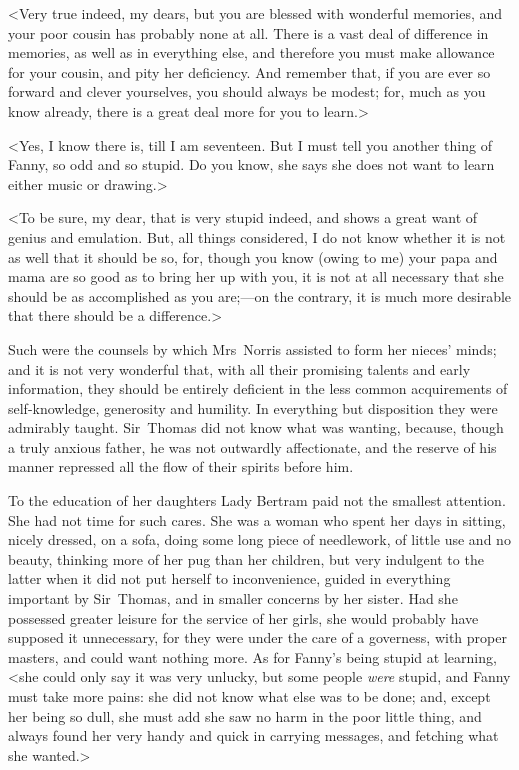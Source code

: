 <Very true indeed, my dears, but you are blessed with wonderful memories, and your poor cousin has probably none at all. There is a vast deal of difference in memories, as well as in everything else, and therefore you must make allowance for your cousin, and pity her deficiency. And remember that, if you are ever so forward and clever yourselves, you should always be modest; for, much as you know already, there is a great deal more for you to learn.>

<Yes, I know there is, till I am seventeen. But I must tell you another thing of Fanny, so odd and so stupid. Do you know, she says she does not want to learn either music or drawing.>

<To be sure, my dear, that is very stupid indeed, and shows a great want of genius and emulation. But, all things considered, I do not know whether it is not as well that it should be so, for, though you know (owing to me) your papa and mama are so good as to bring her up with you, it is not at all necessary that she should be as accomplished as you are;—on the contrary, it is much more desirable that there should be a difference.>

Such were the counsels by which Mrs~Norris assisted to form her nieces' minds; and it is not very wonderful that, with all their promising talents and early information, they should be entirely deficient in the less common acquirements of self-knowledge, generosity and humility. In everything but disposition they were admirably taught. Sir~Thomas did not know what was wanting, because, though a truly anxious father, he was not outwardly affectionate, and the reserve of his manner repressed all the flow of their spirits before him.

To the education of her daughters Lady Bertram paid not the smallest attention. She had not time for such cares. She was a woman who spent her days in sitting, nicely dressed, on a sofa, doing some long piece of needlework, of little use and no beauty, thinking more of her pug than her children, but very indulgent to the latter when it did not put herself to inconvenience, guided in everything important by Sir~Thomas, and in smaller concerns by her sister. Had she possessed greater leisure for the service of her girls, she would probably have supposed it unnecessary, for they were under the care of a governess, with proper masters, and could want nothing more. As for Fanny's being stupid at learning, <she could only say it was very unlucky, but some people \textit{were}  stupid, and Fanny must take more pains: she did not know what else was to be done; and, except her being so dull, she must add she saw no harm in the poor little thing, and always found her very handy and quick in carrying messages, and fetching what she wanted.>

